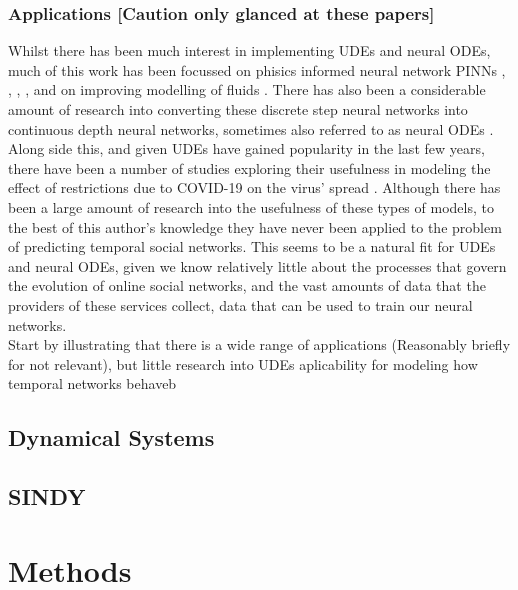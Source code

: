 \documentclass{article}
\begin{document}
        \subsubsection{Applications [Caution only glanced at these papers]}
        Whilst there has been much interest in implementing UDEs and neural ODEs, much of this work has been focussed on phisics informed neural network PINNs \cite{karniadakis2021physics}, \cite{GAO2021110079}, \cite{krishnapriyan2021characterizing}, \cite{roehrl2020modeling}, and on improving modelling of fluids \cite{mahmoudabadbozchelou2021data} \cite{nguyen2022physics}. There has also been a considerable amount of research into converting these discrete step neural networks into continuous depth neural networks, sometimes also referred to as neural ODEs \cite{massaroli2020dissecting} \cite{poli2019graph} \cite{NEURIPS2020_c9f2f917}. Along side this, and given UDEs have gained popularity in the last few years, there have been a number of studies exploring their usefulness in modeling the effect of restrictions due to COVID-19 on the virus' spread \cite{Dandekar2020.04.03.20052084}. Although there has been a large amount of research into the usefulness of these types of models, to the best of this author's knowledge they have never been applied to the problem of predicting temporal social networks. This seems to be a natural fit for UDEs and neural ODEs, given we know relatively little about the processes that govern the evolution of online social networks, and the vast amounts of data that the providers of these services collect, data that can be used to train our neural networks.\\

            
            
        
         Start by illustrating that there is a wide range of applications (Reasonably briefly for not relevant), but little research into UDEs aplicability for modeling how temporal networks behaveb
    \subsection{Dynamical Systems}
    
    \subsection{SINDY}
    



\section{Methods}
    
\end{document}
